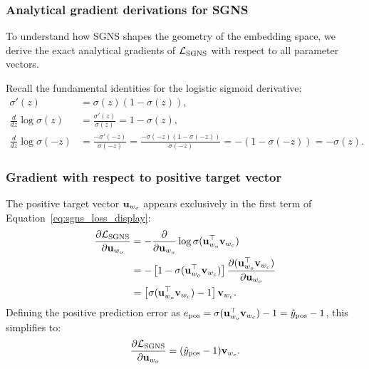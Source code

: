 \documentclass[../../../main.tex]{subfiles}
\begin{document}
\subsubsection{Analytical gradient derivations for SGNS}
\label{subsec:sgns_gradients}

To understand how SGNS shapes the geometry of the embedding space, we derive the exact analytical gradients of $\mathcal{L}_{\text{SGNS}}$ with respect to all parameter vectors.

Recall the fundamental identities for the logistic sigmoid derivative:
\begin{align}
\label{eq:sigmoid_deriv_identity}
\sigma'(z) &= \sigma(z)(1 - \sigma(z)), \\
\label{eq:log_sigmoid_pos}
\frac{d}{dz} \log \sigma(z) &= \frac{\sigma'(z)}{\sigma(z)} = 1 - \sigma(z), \\
\label{eq:log_sigmoid_neg}
\frac{d}{dz} \log \sigma(-z) &= \frac{-\sigma'(-z)}{\sigma(-z)} = \frac{-\sigma(-z)(1 - \sigma(-z))}{\sigma(-z)} = -(1 - \sigma(-z)) = -\sigma(z).
\end{align}

\subsubsection{Gradient with respect to positive target vector}
The positive target vector $\mathbf{u}_{w_o}$ appears exclusively in the first term of Equation~\eqref{eq:sgns_loss_display}:
\begin{align}
\frac{\partial \mathcal{L}_{\text{SGNS}}}{\partial \mathbf{u}_{w_o}} &= -\frac{\partial}{\partial \mathbf{u}_{w_o}} \log \sigma(\mathbf{u}_{w_o}^\top \mathbf{v}_{w_c}) \notag \\
&= -\left[ 1 - \sigma(\mathbf{u}_{w_o}^\top \mathbf{v}_{w_c}) \right] \frac{\partial (\mathbf{u}_{w_o}^\top \mathbf{v}_{w_c})}{\partial \mathbf{u}_{w_o}} \notag \\
\label{eq:grad_u_pos}
&= \left[ \sigma(\mathbf{u}_{w_o}^\top \mathbf{v}_{w_c}) - 1 \right] \mathbf{v}_{w_c}.
\end{align}
Defining the positive prediction error as $e_{\text{pos}} = \sigma(\mathbf{u}_{w_o}^\top \mathbf{v}_{w_c}) - 1 = \hat{y}_{\text{pos}} - 1$, this simplifies to:
\begin{equation}
\label{eq:grad_u_pos_clean}
\frac{\partial \mathcal{L}_{\text{SGNS}}}{\partial \mathbf{u}_{w_o}} = (\hat{y}_{\text{pos}} - 1) \mathbf{v}_{w_c}.
\end{equation}
\end{document}
